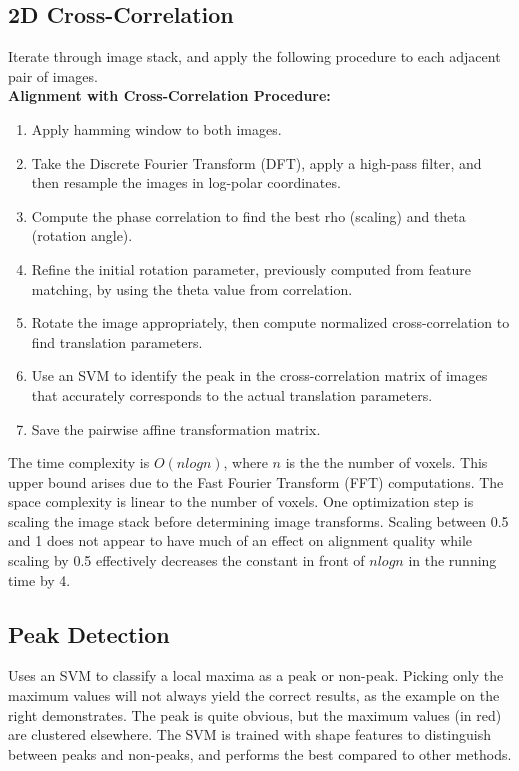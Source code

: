 \documentclass{article}
\begin{document}
\subsection{2D Cross-Correlation}
Iterate through image stack, and apply the following procedure to each adjacent pair of images. \\
\textbf{Alignment with Cross-Correlation Procedure:}
\begin{enumerate}
\item Apply hamming window to both images. 
\item Take the Discrete Fourier Transform (DFT), apply a high-pass filter, and then resample the images in log-polar coordinates. 
\item Compute the phase correlation to find the best rho (scaling) and theta (rotation angle). 
\item Refine the initial rotation parameter, previously computed from feature matching, by using the theta value from correlation. 
\item Rotate the image appropriately, then compute normalized cross-correlation to find translation parameters. 
\item Use an SVM to identify the peak in the cross-correlation matrix of images that accurately corresponds to the actual translation parameters.
\item Save the pairwise affine transformation matrix. 
\end{enumerate}The time complexity is $O(nlogn)$, where $n$ is the the number of voxels. This upper bound arises due to the Fast Fourier Transform (FFT) computations. The space complexity is linear to the number of voxels. One optimization step is scaling the image stack before determining image transforms. Scaling between 0.5 and 1 does not appear to have much of an effect on alignment quality while scaling by 0.5 effectively decreases the constant in front of $nlogn$ in the running time by 4. \\

\subsection{Peak Detection}
Uses an SVM to classify a local maxima as a peak or non-peak. 
Picking only the maximum values will not always yield the correct results, as the example on the right demonstrates. The peak is quite obvious, but the maximum values (in red) are clustered elsewhere. The SVM is trained with shape features to distinguish between peaks and non-peaks, and performs the best compared to other methods.\\
\end{document}
